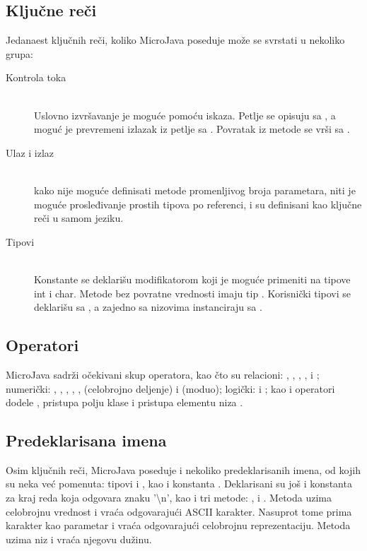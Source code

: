 \subsection*{Ključne reči}

Jedanaest ključnih reči, koliko MicroJava poseduje može se svrstati u nekoliko grupa:

\begin{description}
    \item[Kontrola toka] \hfill \\
    Uslovno izvršavanje je moguće pomoću  iskaza. Petlje se opisuju sa , a moguć je prevremeni izlazak iz petlje sa . Povratak iz metode se vrši sa .

   \item[Ulaz i izlaz] \hfill \\
	kako nije moguće definisati metode promenljivog broja parametara, niti je moguće prosleđivanje prostih tipova po referenci,  i  su definisani kao ključne reči u samom jeziku.

	\item[Tipovi] \hfill \\
	Konstante se deklarišu modifikatorom  koji je moguće primeniti na tipove int i char. Metode bez povratne vrednosti imaju tip . Korisnički tipovi se deklarišu sa , a zajedno sa nizovima instanciraju sa .

\end{description}


\subsection*{Operatori}

MicroJava sadrži očekivani skup operatora, kao čto su relacioni: \mj{<}, \mj{>}, \mj{==}, \mj{<=}, \mj{>=} i \mj{!=}; 
numerički: \mj{+}, \mj{++}, \mj{-}, \mj{--}, \mj{*}, \mj{/} (celobrojno deljenje) i \mj{\%} (moduo); 
logički: \mj{\&\&} i \mj{||}; 
kao i operatori dodele \mj{=}, pristupa polju klase  i pristupa elementu niza \mj{[]}.

\subsection*{Predeklarisana imena}

Osim ključnih reči, MicroJava poseduje i nekoliko predeklarisanih imena, od kojih su neka već pomenuta: tipovi  i , kao i konstanta . Deklarisani su još i konstanta za kraj reda  koja odgovara znaku '\textbackslash n', kao i tri metode: ,  i . Metoda   uzima celobrojnu vrednost i vraća odgovarajući ASCII karakter. Nasuprot tome  prima karakter kao parametar i vraća odgovarajući celobrojnu reprezentaciju. Metoda  uzima niz i vraća njegovu dužinu. 

